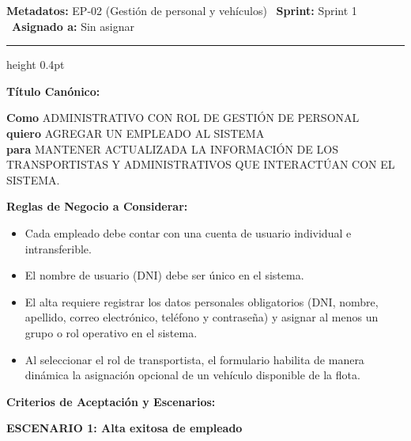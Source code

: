 \documentclass[a4paper,9pt]{article}
\begin{document}
\begin{tcolorbox}[hucard, title={\textbf{HU-7: AGREGAR PERSONAL} \hfill \scriptsize \colorbox{bluestatus}{\textbf{\ New\ }} \quad \colorbox{white}{\textcolor{primarydark}{\textbf{\ 2 pts\ }}}}]
\vspace{-1pt}
\noindent\textbf{\footnotesize Metadatos:} EP-02 (Gestión de personal y vehículos) \textbar\ \textbf{Sprint:} Sprint 1 \textbar\ \textbf{Asignado a:} Sin asignar\par\vspace{2pt}
\hrule height 0.4pt\par\vspace{3pt}
\noindent\textbf{\footnotesize Título Canónico:}\par\vspace{1pt}
{\small \textbf{Como} ADMINISTRATIVO CON ROL DE GESTIÓN DE PERSONAL \\ \textbf{quiero} AGREGAR UN EMPLEADO AL SISTEMA \\ \textbf{para} MANTENER ACTUALIZADA LA INFORMACIÓN DE LOS TRANSPORTISTAS Y ADMINISTRATIVOS QUE INTERACTÚAN CON EL SISTEMA.}\par\vspace{3pt}
\noindent\textbf{\footnotesize Reglas de Negocio a Considerar:}\par\vspace{1pt}
{\footnotesize
\begin{itemize}[leftmargin=12pt, nosep, itemsep=1.5pt, topsep=1pt]
\item Cada empleado debe contar con una cuenta de usuario individual e intransferible.
\item El nombre de usuario (DNI) debe ser único en el sistema.
\item El alta requiere registrar los datos personales obligatorios (DNI, nombre, apellido, correo electrónico, teléfono y contraseña) y asignar al menos un grupo o rol operativo en el sistema.
\item Al seleccionar el rol de transportista, el formulario habilita de manera dinámica la asignación opcional de un vehículo disponible de la flota.
\end{itemize}
}\par\vspace{3pt}
\noindent\textbf{\footnotesize Criterios de Aceptación y Escenarios:}\par\vspace{2pt}
{\footnotesize
\noindent\textbf{\textcolor{secondarydark}{ESCENARIO 1:  Alta exitosa de empleado}}\par\vspace{1pt}
}
\end{tcolorbox}
\end{document}
